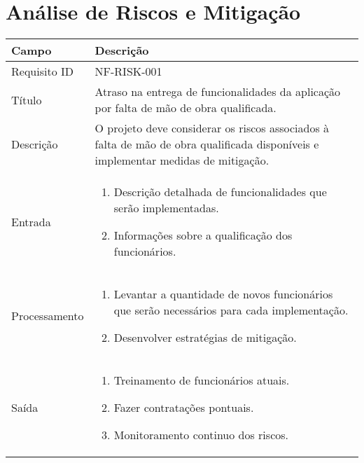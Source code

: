 \chapter{Análise de Riscos e Mitigação}

\begin{table}[htbp]
    \begin{tabularx}{\textwidth}{| l | X |}
    \hline
    Campo             & Descrição                                                                                                                                                                           \\ \hline
    Requisito ID    & NF-RISK-001                                                                                                                                                                              \\ \hline
    Título              & Atraso na entrega de funcionalidades da aplicação por falta de mão de obra qualificada. \\  \hline
    Descrição         & O projeto deve considerar os riscos associados à falta de mão de obra qualificada  disponíveis e implementar medidas de mitigação.\\ \hline
    Entrada & 
    \begin{enumerate}
    \item Descrição detalhada de funcionalidades que serão implementadas.
    \item Informações sobre a qualificação dos funcionários.
    \end{enumerate}

    \\ \hline
    Processamento &
    \begin{enumerate}
        \item Levantar a quantidade de novos funcionários que serão necessários para cada implementação.
        \item Desenvolver estratégias de mitigação.
        \end{enumerate}
    
    \\ \hline
    Saída &  
    \begin{enumerate}
        \item Treinamento de funcionários atuais.
        \item Fazer contratações pontuais.
        \item Monitoramento continuo dos riscos.
    \end{enumerate}
    

\end{tabularx}
\end{table}
